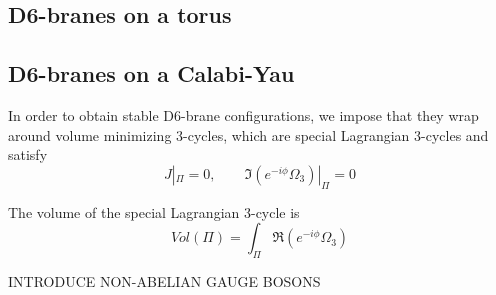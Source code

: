 \subsection{D6-branes on a torus}


\subsection{D6-branes on a Calabi-Yau}
In order to obtain stable D6-brane configurations, we impose that they wrap around volume 
minimizing 3-cycles, which are special Lagrangian 3-cycles and satisfy
\begin{equation}
  J|_\Pi = 0 , \qquad \Im (e^{-i\phi}\Omega_3)|_\Pi=0
\end{equation}

The volume of the special Lagrangian 3-cycle is
\begin{equation}
  Vol(\Pi)=\int_\Pi \Re(e^{-i\phi}\Omega_3)
\end{equation}




INTRODUCE NON-ABELIAN GAUGE BOSONS
